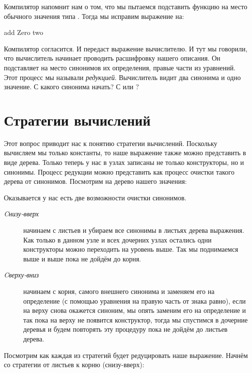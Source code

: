 Компилятор напомнит нам о том, что мы пытаемся подставить функцию
 на место обычного значения типа . Тогда мы исправим
выражение на:


\begin{code}
add Zero two
\end{code}

Компилятор согласится. И передаст выражение вычислителю. И тут мы
говорили, что вычислитель начинает проводить расшифровку нашего
описания. Он подставляет на место синонимов их определения, правые части
из уравнений. Этот процесс мы называли \emph{редукцией}. Вычислитель
видит два синонима и одно значение. С какого синонима начать? С 
или ?

\section{Стратегии вычислений}

Этот вопрос приводит нас к понятию стратегии вычислений. Поскольку
вычисляем мы только константы, то наше выражение также можно представить
в виде дерева. Только теперь у нас в узлах записаны не только
конструкторы, но и синонимы. Процесс редукции можно представить как
процесс очистки такого дерева от синонимов. Посмотрим на дерево нашего
значения:

Оказывается у нас есть две возможности очистки синонимов.

\begin{description}
\item[\emph{Cнизу-вверх}]
 начинаем с листьев и убираем все
синонимы в листьях дерева выражения. Как только в данном узле и всех
дочерних узлах остались одни конструкторы можно переходить на уровень
выше. Так мы поднимаемся выше и выше пока не дойдём до корня.
\item[\emph{Cверху-вниз}]
 начинаем с корня, самого внешнего
синонима и заменяем его на определение (с помощью уравнения на правую
часть от знака равно), если на верху снова окажется синоним, мы опять
заменим его на определение и так пока на верху не появится конструктор,
тогда мы спустимся в дочерние деревья и будем повторять эту процедуру
пока не дойдём до листьев дерева.
\end{description}

Посмотрим как каждая из стратегий будет редуцировать наше выражение.
Начнём со стратегии от листьев к корню (снизу-вверх):


